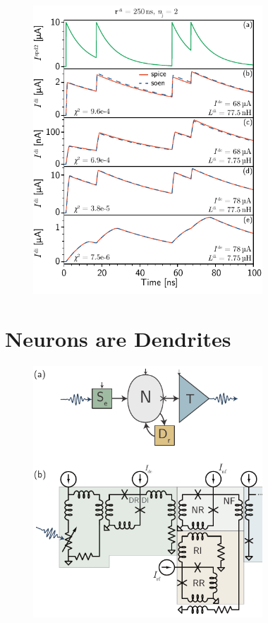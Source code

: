\documentclass[twocolumn]{article}
\begin{document}
\begin{figure}[h!]
\includegraphics[width=8.6cm]{figures/_fig__synapses__comparison__2jj__pulse_sequence.pdf}
\end{figure}

\section{\label{sec:neurons}Neurons are Dendrites}

\begin{figure}[h!]
\includegraphics[width=8.6cm]{figures/_fig__point_neuron__one_synapse__schematic__circuit.pdf}
\end{figure}
\end{document}

